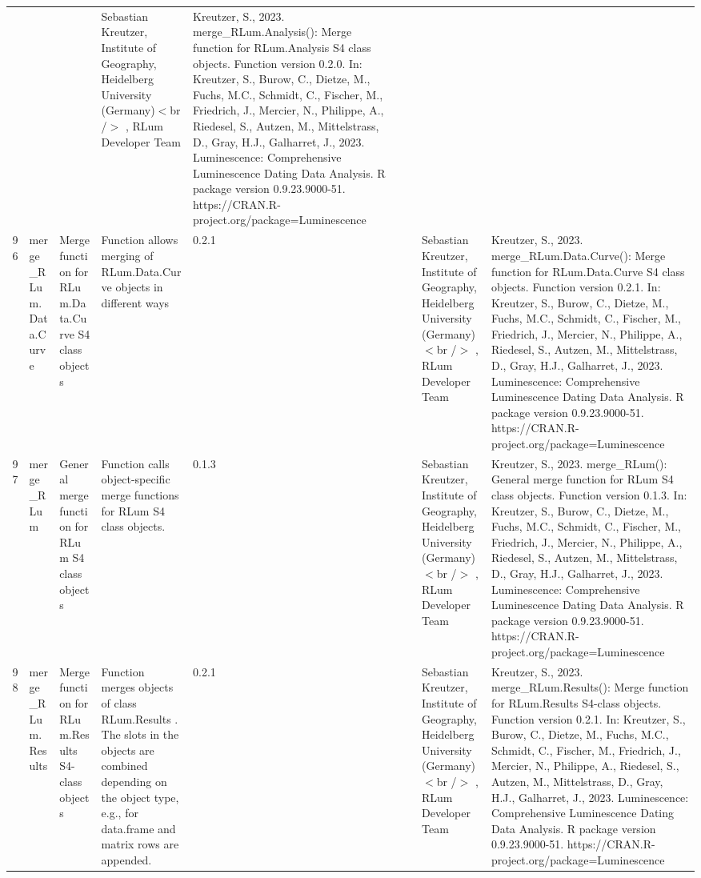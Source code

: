 \begin{table}[ht]
\begin{tabular}{rllllllll}
 &  &  & Sebastian Kreutzer, Institute of Geography, Heidelberg University (Germany)$<$br /$>$ , RLum Developer Team & Kreutzer, S., 2023. merge\_RLum.Analysis(): Merge function for RLum.Analysis S4 class objects. Function version 0.2.0. In: Kreutzer, S., Burow, C., Dietze, M., Fuchs, M.C., Schmidt, C., Fischer, M., Friedrich, J., Mercier, N., Philippe, A., Riedesel, S., Autzen, M., Mittelstrass, D., Gray, H.J., Galharret, J., 2023. Luminescence: Comprehensive Luminescence Dating Data Analysis. R package version 0.9.23.9000-51. https://CRAN.R-project.org/package=Luminescence
 \\ 
  96 & merge\_RLum.Data.Curve & Merge function for RLum.Data.Curve S4 class objects & Function allows merging of RLum.Data.Curve objects in different ways & 0.2.1
 &  &  & Sebastian Kreutzer, Institute of Geography, Heidelberg University (Germany)$<$br /$>$ , RLum Developer Team & Kreutzer, S., 2023. merge\_RLum.Data.Curve(): Merge function for RLum.Data.Curve S4 class objects. Function version 0.2.1. In: Kreutzer, S., Burow, C., Dietze, M., Fuchs, M.C., Schmidt, C., Fischer, M., Friedrich, J., Mercier, N., Philippe, A., Riedesel, S., Autzen, M., Mittelstrass, D., Gray, H.J., Galharret, J., 2023. Luminescence: Comprehensive Luminescence Dating Data Analysis. R package version 0.9.23.9000-51. https://CRAN.R-project.org/package=Luminescence
 \\ 
  97 & merge\_RLum & General merge function for RLum S4 class objects & Function calls object-specific merge functions for RLum S4 class objects. & 0.1.3
 &  &  & Sebastian Kreutzer, Institute of Geography, Heidelberg University (Germany)$<$br /$>$ , RLum Developer Team & Kreutzer, S., 2023. merge\_RLum(): General merge function for RLum S4 class objects. Function version 0.1.3. In: Kreutzer, S., Burow, C., Dietze, M., Fuchs, M.C., Schmidt, C., Fischer, M., Friedrich, J., Mercier, N., Philippe, A., Riedesel, S., Autzen, M., Mittelstrass, D., Gray, H.J., Galharret, J., 2023. Luminescence: Comprehensive Luminescence Dating Data Analysis. R package version 0.9.23.9000-51. https://CRAN.R-project.org/package=Luminescence
 \\ 
  98 & merge\_RLum.Results & Merge function for RLum.Results S4-class objects & Function merges objects of class  RLum.Results . The slots in the objects are combined depending on the object type, e.g., for  data.frame  and  matrix  rows are appended. & 0.2.1
 &  &  & Sebastian Kreutzer, Institute of Geography, Heidelberg University (Germany)$<$br /$>$ , RLum Developer Team & Kreutzer, S., 2023. merge\_RLum.Results(): Merge function for RLum.Results S4-class objects. Function version 0.2.1. In: Kreutzer, S., Burow, C., Dietze, M., Fuchs, M.C., Schmidt, C., Fischer, M., Friedrich, J., Mercier, N., Philippe, A., Riedesel, S., Autzen, M., Mittelstrass, D., Gray, H.J., Galharret, J., 2023. Luminescence: Comprehensive Luminescence Dating Data Analysis. R package version 0.9.23.9000-51. https://CRAN.R-project.org/package=Luminescence

\end{tabular}
\end{table}
